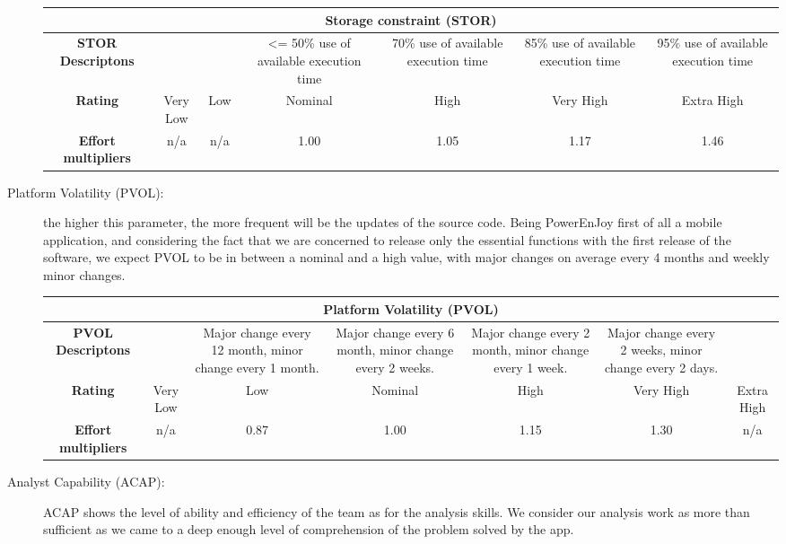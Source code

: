 \begin{description}
\begin{tabular}{ | c | c | c | c | c | c | c | }
\hline
         \multicolumn{7}{|c|}{\textbf{Storage constraint (STOR)}} \\ \hline  \hline
         	\textbf{STOR Descriptons} & & & <= 50\% use of available execution time& 70\% use of available execution time& 85\% use of available execution time &95\% use of available execution time\\ \hline
	\textbf{Rating}&Very Low & Low & Nominal  & High & Very High &Extra High\\ \hline
	\textbf{Effort multipliers} & n/a & n/a & 1.00 & 1.05 & 1.17 & 1.46 \\ \hline
\end{tabular}

\item[Platform Volatility (PVOL):] the higher this parameter, the more frequent will be the updates of the source code. Being PowerEnJoy first of all a mobile application, and considering the fact that we are concerned to release only the essential functions with the first release of the software, we expect PVOL to be in between a nominal and a high value, with major changes on average every 4 months and weekly minor changes.

\begin{tabular}{ | c | c | c | c | c | c | c | }
\hline
         \multicolumn{7}{|c|}{\textbf{Platform Volatility (PVOL)}} \\ \hline  \hline
         	\textbf{PVOL Descriptons} & & Major change every 12 month, minor change every 1 month.&Major change every 6 month, minor change every 2 weeks.&Major change every 2 month, minor change every 1 week.& Major change every 2 weeks, minor change every 2 days. & \\ \hline
	\textbf{Rating}&Very Low & Low & Nominal  & High & Very High &Extra High\\ \hline
	\textbf{Effort multipliers} & n/a & 0.87 & 1.00 & 1.15 & 1.30 & n/a \\ \hline
\end{tabular}

\item[Analyst Capability (ACAP):] ACAP shows the level of ability and efficiency of the team as for the analysis skills. We consider our analysis work as more than sufficient as we came to a deep enough level of comprehension of the problem solved by the app.


\end{description}
